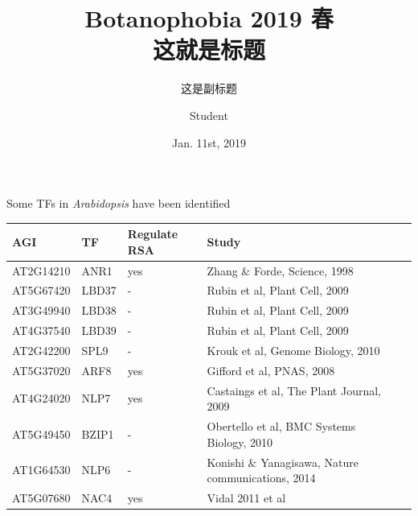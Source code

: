 \documentclass[handout]{beamer}
\title[Gene Co-expression Network]{Botanophobia 2019 春\\这就是标题}
\subtitle{这是副标题}
\institute{生命科学学院}
\author{Student}
\date{Jan. 11st, 2019}
\begin{document}
\begin{frame}[plain]
	\titlepage
\end{frame}

\begin{frame}{Some TFs in \emph{Arabidopsis} have been identified}
	\begin{tabular}{lllll}
		\hline			
		AGI & TF & Regulate RSA & Study \\
		\hline
		AT2G14210 & ANR1 & yes & Zhang \& Forde, Science, 1998  \\
		AT5G67420 & LBD37 & - & Rubin et al, Plant Cell, 2009 \\
		AT3G49940 & LBD38 & - & Rubin et al, Plant Cell, 2009 \\
		AT4G37540 & LBD39 & - & Rubin et al, Plant Cell, 2009\\
		AT2G42200 & SPL9 & - & Krouk et al, Genome Biology, 2010 \\
		AT5G37020 & ARF8 & yes & Gifford et al, PNAS, 2008  \\
		AT4G24020 & NLP7 & yes & Castaings et al, The Plant Journal, 2009 \\
		AT5G49450 & BZIP1 & - & Obertello et al, BMC Systems Biology, 2010 \\
		AT1G64530 & NLP6 & - & Konishi \& Yanagisawa, Nature communications, 2014 \\
		AT5G07680 & NAC4 & yes & Vidal 2011 et al\\
		\hline  
	  \end{tabular}
\end{frame}
\end{document}
